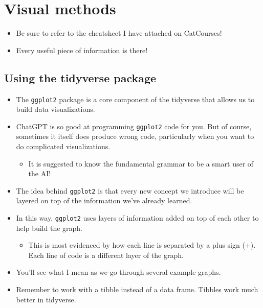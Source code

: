 \documentclass[
]{book}
\providecommand{\tightlist}{%
  \setlength{\itemsep}{0pt}\setlength{\parskip}{0pt}}
\begin{document}
\section{Visual methods}\label{visual-methods}

\begin{itemize}
\item
  Be sure to refer to the cheatsheet I have attached on CatCourses!
\item
  Every useful piece of information is there!
\end{itemize}

\subsection{Using the tidyverse package}\label{using-the-tidyverse-package-1}

\begin{itemize}
\item
  The \texttt{ggplot2} package is a core component of the tidyverse that allows us to build data visualizations.
\item
  ChatGPT is so good at programming \texttt{ggplot2} code for you. But of course, sometimes it itself does produce wrong code, particularly when you want to do complicated visualizations.

  \begin{itemize}
  \tightlist
  \item
    It is suggested to know the fundamental grammar to be a smart user of the AI!
  \end{itemize}
\item
  The idea behind \texttt{ggplot2} is that every new concept we introduce will be layered on top of the information we've already learned.
\item
  In this way, \texttt{ggplot2} uses layers of information added on top of each other to help build the graph.

  \begin{itemize}
  \tightlist
  \item
    This is most evidenced by how each line is separated by a plus sign (+). Each line of code is a different layer of the graph.
  \end{itemize}
\item
  You'll see what I mean as we go through several example graphs.
\item
  Remember to work with a tibble instead of a data frame. Tibbles work much better in tidyverse.
\end{itemize}
\end{document}
